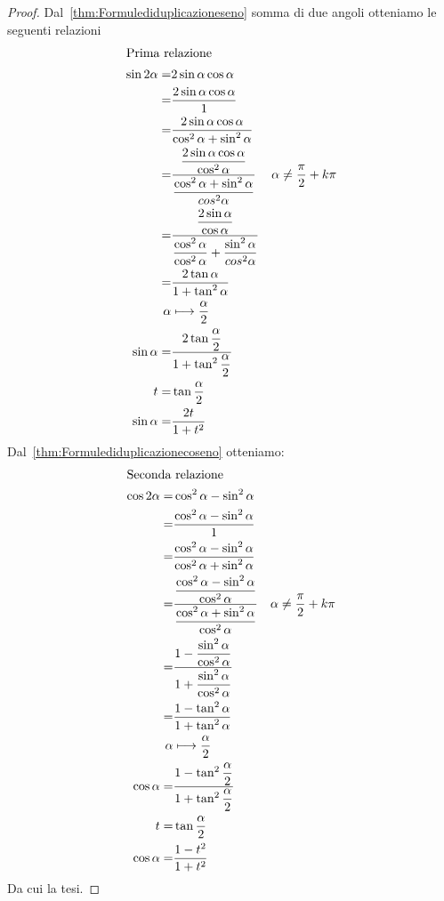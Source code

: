 \begin{proof} Dal~\vref{thm:Formulediduplicazioneseno} somma di due angoli otteniamo le seguenti relazioni
	\begin{align*}
	\intertext{Prima relazione}
	\sin2\alpha=&2\sin\alpha\cos\alpha\\
	=&\frac{2\sin\alpha\cos\alpha}{1}\\
	=&\frac{2\sin\alpha\cos\alpha}{\cos^2\alpha+\sin^2\alpha}\\
	=&\dfrac{\dfrac{2\sin\alpha\cos\alpha}{\cos^2\alpha}}{\dfrac{\cos^2\alpha+\sin^2\alpha}{cos^2\alpha}}&\alpha\neq\frac{\pi}{2}+k\pi\\
	=&\dfrac{\dfrac{2\sin\alpha}{\cos\alpha}}{\dfrac{\cos^2\alpha}{\cos^2\alpha}+\dfrac{\sin^2\alpha}{cos^2\alpha}}\\
	=&\dfrac{2\tan\alpha}{1+\tan^2\alpha}\\
	\alpha&\longmapsto\dfrac{\alpha}{2}\\
	\sin\alpha=&\dfrac{2\tan\dfrac{\alpha}{2}}{1+\tan^2\dfrac{\alpha}{2}}\\
	t=&\tan\frac{\alpha}{2}\\
	\sin\alpha=&\frac{2t}{1+t^2}\\
	\end{align*}
	Dal~\vref{thm:Formulediduplicazionecoseno} otteniamo:
	\begin{align*}
	\intertext{Seconda relazione}
	\cos 2\alpha=&\cos^2\alpha-\sin^2\alpha\\
	=&\dfrac{\cos^2\alpha-\sin^2\alpha}{1}\\
	=&\frac{\cos^2\alpha-\sin^2\alpha}{\cos^2\alpha+\sin^2\alpha}\\
	=&\frac{\dfrac{\cos^2\alpha-\sin^2\alpha}{\cos^2\alpha}}{\dfrac{\cos^2\alpha+\sin^2\alpha}{\cos^2\alpha}}&\alpha\neq\frac{\pi}{2}+k\pi\\ 
	=&\frac{1-\dfrac{\sin^2\alpha}{\cos^2\alpha}}{1+\dfrac{\sin^2\alpha}{\cos^2\alpha}}\\
	=&\frac{1-\tan^2\alpha}{1+\tan^2\alpha}\\
	\alpha&\longmapsto\dfrac{\alpha}{2}\\
	\cos\alpha=&\frac{1-\tan^2\dfrac{\alpha}{2}}{1+\tan^2\dfrac{\alpha}{2}}\\
	t=&\tan\frac{\alpha}{2}\\
	\cos\alpha=&\frac{1-t^2}{1+t^2}
	\end{align*}
	Da cui la tesi.
\end{proof}